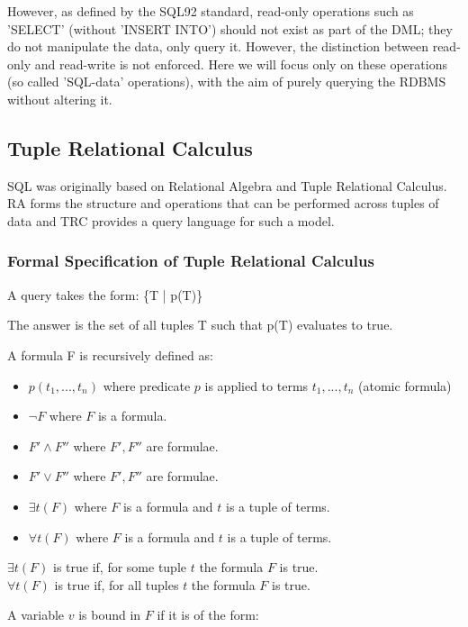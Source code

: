 \documentclass[a4paper, 11pt]{article}
\begin{document}
  However, as defined by the SQL92 standard\cite{isoSQL}, read-only operations
  such as 'SELECT' (without 'INSERT INTO') should not exist as part of the DML;
  they do not manipulate the data, only query it. However, the distinction
  between read-only and read-write is not enforced. Here we will focus only on
  these operations (so called 'SQL-data' operations), with the aim of purely
  querying the RDBMS without altering it.

\subsection{Tuple Relational Calculus}
  SQL was originally based on Relational Algebra and Tuple Relational
  Calculus. RA forms the structure and operations that can be performed
  across tuples of data and TRC provides a query language for such a model.

  \subsubsection{Formal Specification of Tuple Relational Calculus\cite{lecRA}}
    \label{sec:formalTRC}
    A query takes the form: \{T | p(T)\}

    The answer is the set of all tuples T such that p(T) evaluates to true.

    A formula F is recursively defined as:
    \begin{itemize}
      \item $p(t_1, ..., t_n)$ where predicate $p$ is applied to terms $t_1, ..., t_n$ (atomic formula)
        \item $\lnot F$ where $F$ is a formula.
        \item $F' \land F''$ where $F', F''$ are formulae.
        \item $F' \lor F''$ where $F', F''$ are formulae.
        \item $\exists t(F)$ where $F$ is a formula and $t$ is a tuple of terms.
        \item $\forall t(F)$ where $F$ is a formula and $t$ is a tuple of terms.
      \end{itemize}

      $\exists t(F)$ is true if, for some tuple $t$ the formula $F$ is true. \\
      $\forall t(F)$ is true if, for all tuples $t$ the formula $F$ is true.

      A variable $v$ is bound in $F$ if it is of the form:
\end{document}
